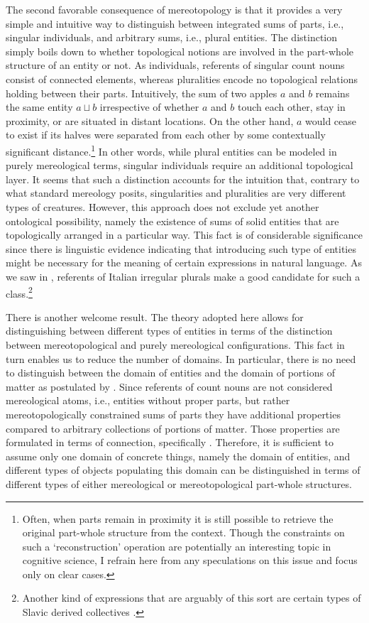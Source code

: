 	The second favorable consequence of mereotopology is that it provides a very simple and intuitive way to distinguish between integrated sums of parts, i.e., singular individuals, and arbitrary sums, i.e., plural entities. The distinction simply boils down to whether topological notions are involved in the part-whole structure of an entity or not. As  individuals, referents of singular count nouns consist of connected elements, whereas pluralities encode no topological relations holding between their parts. Intuitively, the sum of two apples $a$ and $b$ remains the same entity $a\sqcup b$ irrespective of whether $a$ and $b$ touch each other, stay in proximity, or are situated in distant locations. On the other hand, $a$ would cease to exist if its halves were separated from each other by some contextually significant distance.\footnote{Often, when parts remain in proximity it is still possible to retrieve the original part-whole structure from the context. Though the constraints on such a `reconstruction' operation are potentially an interesting topic in cognitive science, I refrain here from any speculations on this issue and focus only on clear cases.} In other words, while plural entities can be modeled in purely mereological terms, singular individuals require an additional topological layer. It seems that such a distinction accounts for the intuition that, contrary to what standard mereology posits, singularities and pluralities are very different types of creatures. However, this approach does not exclude yet another ontological possibility, namely the existence of sums of solid entities that are topologically arranged in a particular way. This fact is of considerable significance since there is linguistic evidence indicating that introducing such type of entities might be necessary for the meaning of certain expressions in natural language. As we saw in  , referents of Italian irregular plurals make a good candidate for such a class.\footnote{Another kind of expressions that are arguably of this sort are certain types of Slavic derived collectives \citep[see][]{docekal_wagiel2018decomposing,grimm_docekal-toappear-counting}.}
	
	There is another welcome result. The theory adopted here allows for distinguishing between different types of entities in terms of the distinction between mereotopological and purely mereological configurations. This fact in turn enables us to reduce the number of domains. In particular, there is no need to distinguish between the domain of entities and the domain of portions of matter as postulated by \citet{link1983logical}. Since referents of count nouns are not considered mereological atoms, i.e., entities without proper parts, but rather mereotopologically constrained sums of parts they have additional properties compared to arbitrary collections of portions of matter. Those properties are formulated in terms of connection, specifically . Therefore, it is sufficient to assume only one domain of concrete things, namely the domain of entities, and different types of objects populating this domain can be distinguished in terms of different types of either mereological or mereotopological part-whole structures. 
	
